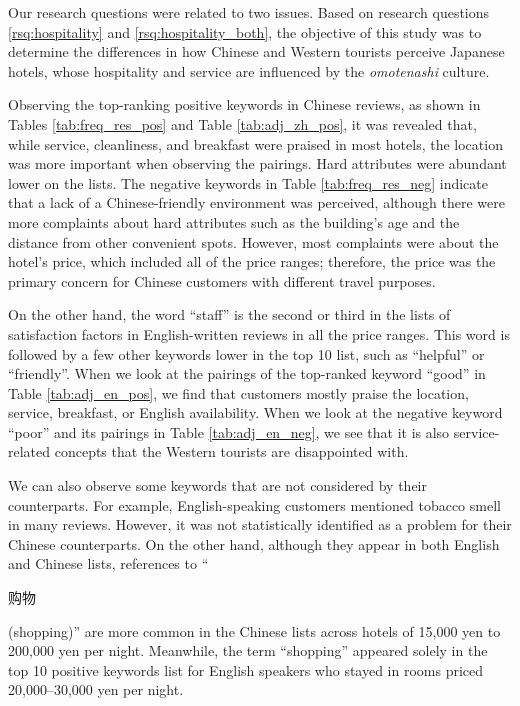 \documentclass[smallextended,natbib]{svjour3}       %
\begin{document}
    Our research questions were related to two issues. Based on research questions \ref{rsq:hospitality} and \ref{rsq:hospitality_both}, the objective of this study was to determine the differences in how Chinese and Western tourists perceive Japanese hotels, whose hospitality and service are influenced by the \textit{omotenashi} culture. 

    Observing the top-ranking positive keywords in Chinese reviews, as shown in Tables \ref{tab:freq_res_pos} and Table \ref{tab:adj_zh_pos}, it was revealed that, while service, cleanliness, and breakfast were praised in most hotels, the location was more important when observing the pairings. Hard attributes were abundant lower on the lists. The negative keywords in Table \ref{tab:freq_res_neg} indicate that a lack of a Chinese-friendly environment was perceived, although there were more complaints about hard attributes such as the building's age and the distance from other convenient spots. However, most complaints were about the hotel's price, which included all of the price ranges; therefore, the price was the primary concern for Chinese customers with different travel purposes.

    On the other hand, the word ``staff'' is the second or third in the lists of satisfaction factors in English-written reviews in all the price ranges. This word is followed by a few other keywords lower in the top 10 list, such as ``helpful'' or ``friendly''. When we look at the pairings of the top-ranked keyword ``good'' in Table \ref{tab:adj_en_pos}, we find that customers mostly praise the location, service, breakfast, or English availability. When we look at the negative keyword ``poor'' and its pairings in Table \ref{tab:adj_en_neg}, we see that it is also service-related concepts that the Western tourists are disappointed with. 

    We can also observe some keywords that are not considered by their counterparts. For example, English-speaking customers mentioned tobacco smell in many reviews. However, it was not statistically identified as a problem for their Chinese counterparts. On the other hand, although they appear in both English and Chinese lists, references to ``\begin{CJK}{UTF8}{gbsn}购物\end{CJK} (shopping)'' are more common in the Chinese lists across hotels of 15,000 yen to 200,000 yen per night. Meanwhile, the term ``shopping'' appeared solely in the top 10 positive keywords list for English speakers who stayed in rooms priced 20,000–30,000 yen per night.
\end{document}
